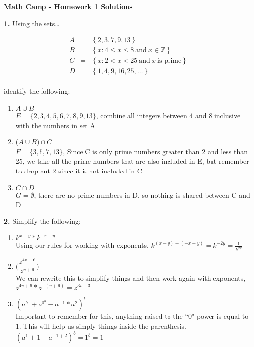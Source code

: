 \documentclass[12pt]{article}
\newcommand{\Z}{\mathbb{Z}}
\begin{document}
\centerline{\bf Math Camp - Homework 1 Solutions}


\bigskip

\noindent \textbf{1.} Using the sets\ldots

\begin{eqnarray*}
A&=&\left\{2,3,7,9,13 \right\} \\
B&=&\left\{ x: 4\leq x \leq 8 \  \mbox{and} \ x \in \Z \right\} \\
C&=&\left\{ x: 2< x < 25 \  \mbox{and} \  x \  \mbox{is prime}  \right\} \\
D&=&\left\{ 1,4,9,16,25, \ldots  \right\} \\
\end{eqnarray*}

identify the following:


\bigskip

\begin{enumerate}
\item $A\cup B$\\
$E = \{2,3,4,5,6,7,8,9,13\}$, combine all integers between 4 and 8 inclusive with the numbers in set A
\item ($A\cup B) \cap C$\\
$F = \{3,5,7,13\}$, Since C is only prime numbers greater than 2 and less than 25, we take all the prime numbers that are also included in E, but remember to drop out 2 since it is not included in C
\item $C \cap D$\\
$G = \emptyset$, there are no prime numbers in D, so nothing is shared between C and D
\end{enumerate}

\bigskip

\noindent \textbf{2.} Simplify the following:

\begin{enumerate}
\item $k^{x-y}*k^{-x-y} $\\
Using our rules for working with exponents, $k^{(x-y)+(-x-y)} = k^{-2y} = \frac{1}{k^{2y}}$\\
\item     $\bigg (   \dfrac{z^{4v+6}}{z^{v+9}} \bigg )$\\
We can rewrite this to simplify things and then work again with exponents,\\ $z^{4v+6}*z^{-(v+9)} = z^{3v-3}$\\
\item  $(a^{b^0} + a^{0^b} - a^{-1} * a^2)^b $\\
Important to remember  for this, anything raised to the ``0" power is equal to 1. This will help us simply things inside the parenthesis.\\
$(a^1 + 1 - a^{-1+2})^b = 1^b = 1$\\
\end{enumerate}
\end{document}
